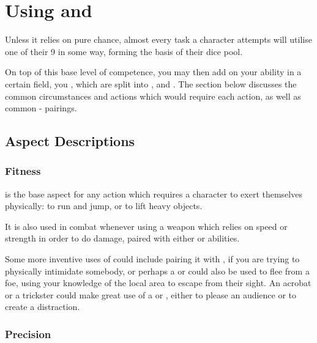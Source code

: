 \section{Using  and } \label{S:Proficiencies}

Unless it relies on pure chance, almost every task a character attempts will utilise one of their 9  in some way, forming the basis of their dice pool. 

On top of this base level of competence, you may then add on your ability in a certain field, you , which are split into ,  and . The section below discusses the common circumstances and actions which would require each action, as well as common - pairings. 

\def\itdef{\renewcommand\labelitemi{-}
\itemsep-0.5em}
\newcommand\proficiency[2]
{
	\textbf{\textit{#1}}: {\raggedright #2} 
}
\subsection{Aspect Descriptions}

\subsubsection{Fitness}

 is the base aspect for any action which requires a character to exert themselves physically: to run and jump, or to lift heavy objects. 

It is also used in combat whenever using a weapon which relies on speed or strength in order to do damage, paired with either  or  abilities.

Some more inventive uses of  could include pairing it with , if you are trying to physically intimidate somebody, or perhaps a  or  could also be used to flee from a foe, using your knowledge of the local area to escape from their sight. An acrobat or a trickster could make great use of a  or , either to please an audience or to create a distraction. 

\subsubsection{Precision}

